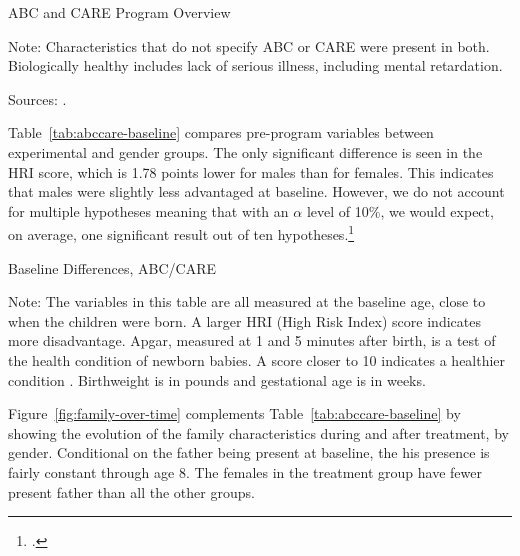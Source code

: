 \begin{table}[H]
\centering
\caption{ABC and CARE Program Overview}
\label{tab:abc-care-characteristics}
\begin{threeparttable}
	
\begin{tablenotes}
\item Note: Characteristics that do not specify ABC or CARE were present in both. Biologically healthy includes lack of serious illness, including mental retardation.
\item Sources: \citet{Ramey_Collier_etal_1976_CarolinaAbecedarianProject,Ramey_Smith_1977_AJMD,Ramey_etal_1985_Project-CARE_TiECSE,Wasik_Ramey_etal_1990_CD,Ramey_Campbell_1991_childreninpoverty}.
\end{tablenotes}
\end{threeparttable}
\end{table}

Table~\ref{tab:abccare-baseline} compares pre-program variables between experimental and gender groups. The only significant difference is seen in the HRI score, which is 1.78 points lower for males than for females. This indicates that males were slightly less advantaged at baseline. However, we do not account for multiple hypotheses meaning that with an $\alpha$ level of 10\%, we would expect, on average, one significant result out of ten hypotheses.\footnote{\citet{Romano_Wolf_2005_JASA}.}

\begin{table}[H]
\centering
\caption{Baseline Differences, ABC/CARE}
\label{tab:abccare-baseline}
\begin{threeparttable}
	
\begin{tablenotes}
\footnotesize
\item Note: The variables in this table are all measured at the baseline age, close to when the children were born. A larger HRI (High Risk Index) score indicates more disadvantage. Apgar, measured at 1 and 5 minutes after birth, is a test of the health condition of newborn babies. A score closer to 10 indicates a healthier condition \citep{Apgar_1966_APGAR-Scoring_PCNA}. Birthweight is in pounds and gestational age is in weeks. 
\end{tablenotes}
\end{threeparttable}
\end{table}

Figure~\ref{fig:family-over-time} complements Table~\ref{tab:abccare-baseline} by showing the evolution of the family characteristics during and after treatment, by gender. Conditional on the father being present at baseline, the his presence is fairly constant through age 8. The females in the treatment group have fewer present father than all the other groups.

